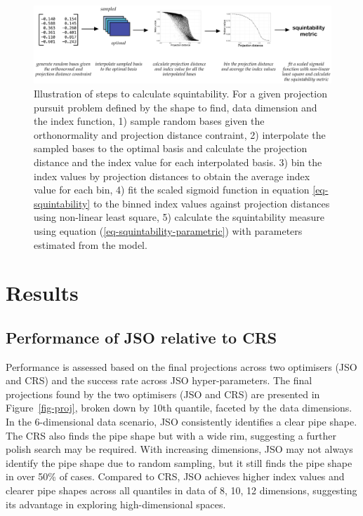 \documentclass[
  12pt,
]{interact}
\theoremstyle{plain}
\begin{document}
\begin{figure}

{\centering \includegraphics[width=1\textwidth,height=\textheight]{figures/squintability.png}

}

\caption{\label{fig-squintability}Illustration of steps to calculate
squintability. For a given projection pursuit problem defined by the
shape to find, data dimension and the index function, 1) sample random
bases given the orthonormality and projection distance contraint, 2)
interpolate the sampled bases to the optimal basis and calculate the
projection distance and the index value for each interpolated basis. 3)
bin the index values by projection distances to obtain the average index
value for each bin, 4) fit the scaled sigmoid function in equation
\eqref{eq-squintability} to the binned index values against projection
distances using non-linear least square, 5) calculate the squintability
measure using equation (\ref{eq-squintability-parametric}) with
parameters estimated from the model.}

\end{figure}

\hypertarget{sec-sim-res}{%
\section{Results}\label{sec-sim-res}}

\hypertarget{performance-of-jso-relative-to-crs}{%
\subsection{Performance of JSO relative to
CRS}\label{performance-of-jso-relative-to-crs}}

Performance is assessed based on the final projections across two
optimisers (JSO and CRS) and the success rate across JSO
hyper-parameters. The final projections found by the two optimisers (JSO
and CRS) are presented in Figure~\ref{fig-proj}, broken down by 10th
quantile, faceted by the data dimensions. In the 6-dimensional data
scenario, JSO consistently identifies a clear pipe shape. The CRS also
finds the pipe shape but with a wide rim, suggesting a further polish
search may be required. With increasing dimensions, JSO may not always
identify the pipe shape due to random sampling, but it still finds the
pipe shape in over 50\% of cases. Compared to CRS, JSO achieves higher
index values and clearer pipe shapes across all quantiles in data of 8,
10, 12 dimensions, suggesting its advantage in exploring
high-dimensional spaces.
\end{document}

